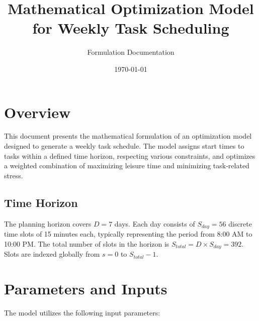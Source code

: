 \documentclass{article}
\title{Mathematical Optimization Model for Weekly Task Scheduling}
\author{Formulation Documentation}
\date{\today}
\begin{document}
\maketitle

\section{Overview}

This document presents the mathematical formulation of an optimization model designed to generate a weekly task schedule. The model assigns start times to tasks within a defined time horizon, respecting various constraints, and optimizes a weighted combination of maximizing leisure time and minimizing task-related stress.

\subsection*{Time Horizon}
The planning horizon covers $D = 7$ days. Each day consists of $S_{day} = 56$ discrete time slots of 15 minutes each, typically representing the period from 8:00 AM to 10:00 PM. The total number of slots in the horizon is $S_{total} = D \times S_{day} = 392$. Slots are indexed globally from $s = 0$ to $S_{total}-1$.

\section{Parameters and Inputs}

The model utilizes the following input parameters:
\end{document}
